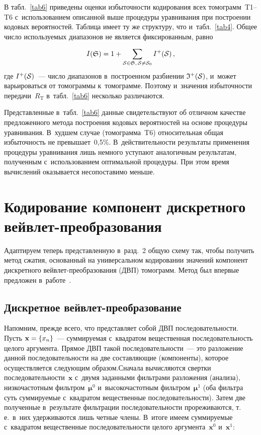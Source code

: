 \begin{multicols}{2}
В табл.~\ref{tab6} приведены оценки избыточности кодирования всех томограмм~T1--T6 
с~использованием описанной выше процедуры уравнивания при построении кодовых 
вероятностей. Таблица имеет ту же структуру, что и~табл.~\ref{tab4}. Общее число 
используемых диапазонов не является фиксированным, равно

\noindent
$$
 I(\frak S) =1 +  \sum\limits_{{\cal S}\in{\frak S},\, {\cal S}\neq{\cal S}_0} 
 I^+({\cal S})\,,
$$
где $I^+({\cal S})$~--- число диапазонов в~построенном разбиении 
${\frak I}^+({\cal S})$, и~может варьироваться от томограммы к~томограмме. 
Поэтому и~значения избыточности передачи~$R_{\mathrm{T}}$ в~табл.~\ref{tab6} несколько 
различаются.



Представленные в~табл.~\ref{tab6} данные свидетельствуют об отличном 
качестве предложенного метода построения кодовых вероятностей на основе 
процедуры уравнивания. В~худшем случае (томограмма~T6) относительная общая 
избыточность не превышает~0,5\%. В~действительности результаты применения 
процедуры уравнивания лишь немного уступают аналогичным результатам, 
полученным с~использованием оптимальной процедуры. При этом время 
вычислений оказывается несопоставимо меньше.

\vspace*{-6pt}


\section{Кодирование компонент дискретного вейвлет-преобразования}

Адаптируем теперь представленную в~разд.~2 общую схему так, чтобы получить 
метод сжатия, основанный на универсальном кодировании значений компонент 
дискретного вейв\-лет-пре\-об\-ра\-зо\-ва\-ния (ДВП) томограмм. Метод был впервые 
предложен в~работе~\cite{b05}.

\vspace*{-6pt}

\subsection{Дискретное вейвлет-преобразование}

Напомним, прежде всего, что представляет собой ДВП последовательности. 
Пусть $\mathbf{x}\hm=\{x_n\}$~--- суммируемая с~квадратом вещественная 
последовательность целого аргумента. Прямое ДВП \mbox{такой} последовательности~--- 
это разложение данной последовательности на две составляющие (компоненты), 
которое осуществляется следующим образом.\linebreak Сначала вычисляются свертки 
последователь\-ности~$\mathbf {x}$  с~двумя заданными фильтрами разложения 
(анализа), низкочастотным фильтром~${\boldsymbol\mu}^0$ и~высокочастотным 
фильтром~${\boldsymbol\mu}^1$  (оба фильтра суть сум\-мируемые с~квадратом 
вещественные последовательности). Затем две полученные в~результате 
фильт\-ра\-ции последовательности прореживаются, т.\,е.\ в~них удерживаются лишь 
четные члены. В~итоге имеем суммируемые с~квадратом вещественные последовательности 
целого аргумента~$\mathbf{x}^{0}$ и~$\mathbf{x}^{1}$:


\end{multicols}
